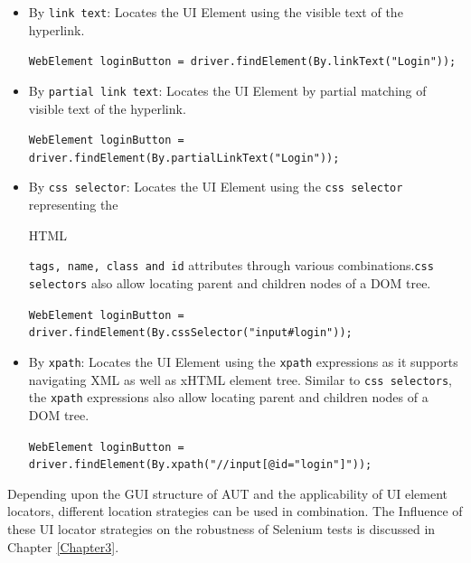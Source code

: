 \begin{itemize}
\item 
By \texttt{link text}:
Locates the UI Element using the visible text of the hyperlink.
\newline
\begin{footnotesize}
\texttt{WebElement loginButton = driver.findElement(By.linkText("Login"));
}
\end{footnotesize}

\item 
By \texttt{partial link text}:
Locates the UI Element by partial matching of visible text of the hyperlink.
\newline
\begin{footnotesize}
\texttt{WebElement loginButton = driver.findElement(By.partialLinkText("Login"));
}
\end{footnotesize}
\item 
By \texttt{css selector}:
Locates the UI Element using the \texttt{css selector} representing the \begin{footnotesize} HTML\end{footnotesize} \texttt{tags, name, class and id} attributes through various combinations.\texttt{css selectors} also allow locating parent and children nodes of a DOM tree. 
\newline
\begin{footnotesize}
\texttt{WebElement loginButton = driver.findElement(By.cssSelector("input\#login"));
}
\end{footnotesize}
\item 
By \texttt{xpath}:
Locates the UI Element using the \texttt{xpath} expressions as it supports navigating XML as well as xHTML element tree. Similar to \texttt{css selectors}, the \texttt{xpath} expressions also allow locating parent and children nodes of a DOM tree. 
\newline
\begin{footnotesize}
\texttt{WebElement loginButton = driver.findElement(By.xpath("//input[@id="login"]"));
}
\end{footnotesize}
\end{itemize}
Depending upon the GUI structure of AUT and the applicability of UI element locators, different location strategies can be used in combination. The Influence of these UI locator strategies on the robustness of Selenium tests is discussed in Chapter \ref{Chapter3}.

